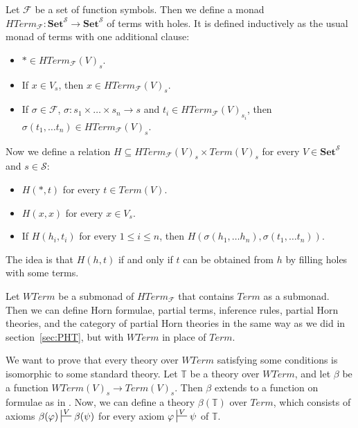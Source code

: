 \documentclass[reqno]{amsart}
\theoremstyle{definition}
\theoremstyle{remark}
\newcommand{\cat}[1]{\mathbf{#1}}
\newcommand{\Set}{\cat{Set}}
\numberwithin{figure}{section}
\begin{document}
Let $\mathcal{F}$ be a set of function symbols.
Then we define a monad $HTerm_\mathcal{F} : \Set^\mathcal{S} \to \Set^\mathcal{S}$ of terms with holes.
It is defined inductively as the usual monad of terms with one additional clause:
\begin{itemize}
\item $* \in HTerm_\mathcal{F}(V)_s$.
\item If $x \in V_s$, then $x \in HTerm_\mathcal{F}(V)_s$.
\item If $\sigma \in \mathcal{F}$, $\sigma : s_1 \times \ldots \times s_n \to s$ and $t_i \in HTerm_\mathcal{F}(V)_{s_i}$, then $\sigma(t_1, \ldots t_n) \in HTerm_\mathcal{F}(V)_s$.
\end{itemize}

Now we define a relation $H \subseteq HTerm_\mathcal{F}(V)_s \times Term(V)_s$ for every $V \in \Set^\mathcal{S}$ and $s \in \mathcal{S}$:
\begin{itemize}
\item $H(*,t)$ for every $t \in Term(V)$.
\item $H(x,x)$ for every $x \in V_s$.
\item If $H(h_i,t_i)$ for every $1 \leq i \leq n$, then $H(\sigma(h_1, \ldots h_n), \sigma(t_1, \ldots t_n))$.
\end{itemize}
The idea is that $H(h,t)$ if and only if $t$ can be obtained from $h$ by filling holes with some terms.

Let $WTerm$ be a submonad of $HTerm_\mathcal{F}$ that contains $Term$ as a submonad.
Then we can define Horn formulae, partial terms, inference rules, partial Horn theories, and the category of partial Horn theories
    in the same way as we did in section~\ref{sec:PHT}, but with $WTerm$ in place of $Term$.

We want to prove that every theory over $WTerm$ satisfying some conditions is isomorphic to some standard theory.
Let $\mathbb{T}$ be a theory over $WTerm$, and let $\beta$ be a function $WTerm(V)_s \to Term(V)_s$.
Then $\beta$ extends to a function on formulae as in .
Now, we can define a theory $\beta(\mathbb{T})$ over $Term$, which consists of axioms
    $\beta(\varphi) \sststile{}{V} \beta(\psi)$ for every axiom $\varphi \sststile{}{V} \psi$ of $\mathbb{T}$.
\end{document}
